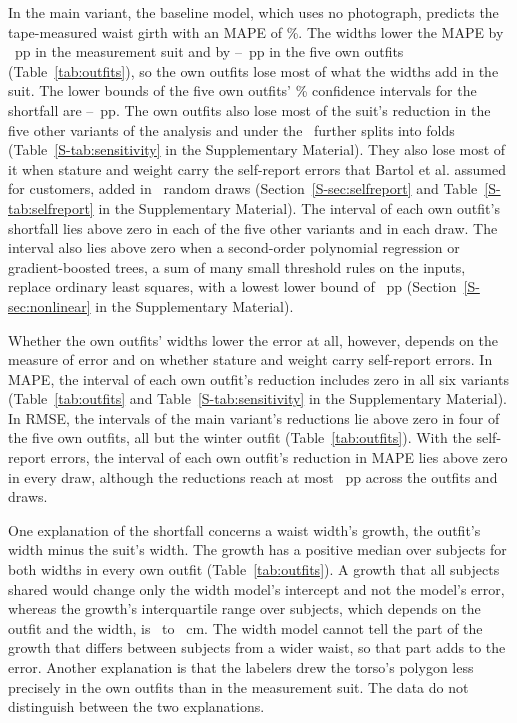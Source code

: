 \documentclass[12pt]{article}
\begin{document}
In the main variant, the baseline model, which uses no photograph, predicts the
tape-measured waist girth with an MAPE of \mapeBaseline\%. The widths lower the MAPE by \redSuit~pp in the measurement
suit and by \redOwnMin--\redOwnMax~pp in the five own outfits (Table~\ref{tab:outfits}), so the own outfits lose most of what the widths add in the suit. 
The lower bounds of the five own outfits' \ciLevel\% confidence intervals for the
shortfall are \shortfallLoMin--\shortfallLoMax~pp. The own outfits also lose most of the suit's reduction in the five other variants of the analysis and under the \nPartitionSeeds\ further splits into folds (Table~\ref{S-tab:sensitivity} in
the Supplementary Material). They also lose most of it when stature and weight carry the self-report errors that Bartol et
al.\cite{bartol2022} assumed for customers, added in \nDraws\ random draws (Section~\ref{S-sec:selfreport} and
Table~\ref{S-tab:selfreport} in the Supplementary Material). The interval of each own outfit's shortfall lies above
zero in each of the five other variants and in each draw. The interval also lies above zero when a second-order polynomial regression or gradient-boosted trees, a sum of many small threshold rules on the inputs, replace ordinary least squares, with a lowest lower bound of
\nlShortfallLoMin~pp (Section~\ref{S-sec:nonlinear} in the Supplementary Material).

Whether the own outfits' widths lower the error at all, however, depends on the measure of error and on whether
stature and weight carry self-report errors. In MAPE, the interval of each own outfit's reduction includes zero in all
six variants (Table~\ref{tab:outfits} and Table~\ref{S-tab:sensitivity} in the Supplementary Material). In RMSE, the
intervals of the main variant's reductions lie above zero in four of the five own outfits, all but the winter outfit
(Table~\ref{tab:outfits}). With the self-report errors, the interval of each own outfit's reduction in MAPE lies above
zero in every draw, although the reductions reach at most \selfRedOwnMax~pp across
the outfits and draws.

One explanation of the shortfall concerns a waist width's growth, the outfit's width minus the suit's width. The
growth has a positive median over subjects for both widths in every own outfit (Table~\ref{tab:outfits}). A growth that all subjects shared would change only the width model's intercept and not the model's error, whereas
the growth's interquartile range over subjects, which depends on the outfit and the width, is \growthIqrMin\ to
\growthIqrMax~cm. The width model cannot tell the part of the growth that differs between subjects from
a wider waist, so that part adds to the error. Another explanation is that the labelers drew the torso's polygon less
precisely in the own outfits than in the measurement suit. The data do not distinguish between the two explanations.
\end{document}
